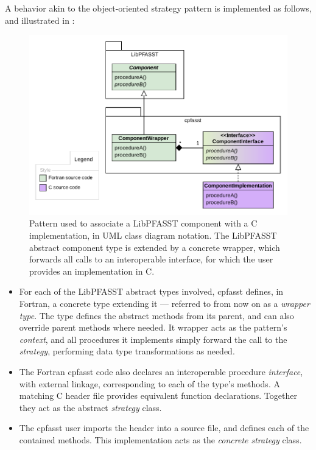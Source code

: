 A behavior akin to the object-oriented strategy pattern is implemented as follows, and illustrated in :
\begin{figure}[ht]
  \centering
  \includegraphics[width=\textwidth]{images/uml_wrapper_pattern.pdf}
  \caption{Pattern used to associate a LibPFASST component with a C implementation, in UML class diagram notation. The LibPFASST abstract component type is extended by a concrete wrapper, which forwards all calls to an interoperable interface, for which the user provides an implementation in C.}
  \label{fig:uml_strategy_mimic}
\end{figure}

\begin{itemize}
    \item For each of the LibPFASST abstract types involved, cpfasst defines, in Fortran, a concrete type extending it --- referred to from now on as a \textit{wrapper type}. The type defines the abstract methods from its parent, and can also override parent methods where needed. It wrapper acts as the pattern's \textit{context}, and all procedures it implements simply forward the call to the \textit{strategy}, performing data type transformations as needed.
    \item The Fortran cpfasst code also declares an interoperable procedure \textit{interface}, with external linkage, corresponding to each of the type's methods. A matching C header file provides equivalent function declarations. Together they act as the abstract \textit{strategy} class.
    \item The cpfasst user imports the header into a source file, and defines each of the contained methods. This implementation acts as the \textit{concrete strategy} class.
\end{itemize}

